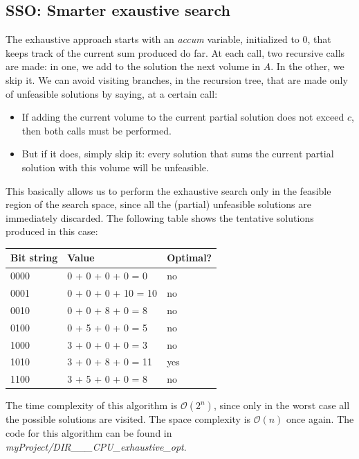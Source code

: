 \documentclass[12pt]{extarticle}
\begin{document}
\subsection{SSO: Smarter exaustive search}
\label{SSO-smarter-exhaustive-search}
The exhaustive approach starts with an \emph{accum} variable, initialized to 0, that keeps track of the current sum produced do far. At each call, two recursive calls are made: in one, we add to the solution the next volume in $A$. In the other, we skip it. We can avoid visiting branches, in the recursion tree, that are made only of unfeasible solutions by saying, at a certain call:
\begin{itemize}
    \item If adding the current volume to the current partial solution does not exceed $c$, then both calls must be performed.
    \item But if it does, simply skip it: every solution that sums the current partial solution with this volume will be unfeasible.
\end{itemize}
This basically allows us to perform the exhaustive search only in the feasible region of the search space, since all the (partial) unfeasible solutions are immediately discarded. The following table shows the tentative solutions produced in this case:
\begin{center}
\begin{tabular}{ | m{2cm} | m{5cm}| m{2cm} |}
 \hline
 Bit string & Value & Optimal?\\
 \hline
 0000 & 0 + 0 + 0 + 0 = 0 & no\\
 \hline
 0001 & 0 + 0 + 0 + 10 = 10 & no\\
 \hline
 0010 & 0 + 0 + 8 + 0 = 8 & no\\
 \hline
 0100 & 0 + 5 + 0 + 0 = 5 & no\\
 \hline
 1000 & 3 + 0 + 0 + 0 = 3 & no\\
 \hline
 1010 & 3 + 0 + 8 + 0 = 11 & yes\\
 \hline
 1100 & 3 + 5 + 0 + 0 = 8 & no\\
 \hline
\end{tabular}
\end{center}
The time complexity of this algorithm is $\mathcal{O}(2^{n})$, since only in the worst case all the possible solutions are visited. The space complexity is $\mathcal{O}(n)$ once again.\newline
The code for this algorithm can be found in \emph{myProject/DIR\_\_\_CPU\_exhaustive\_opt}.\newline
\end{document}
